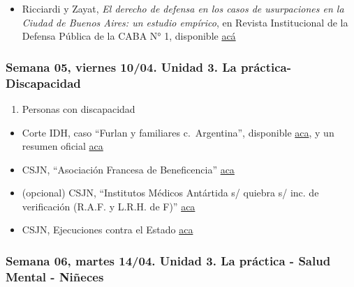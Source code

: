 \documentclass[
]{article}
\providecommand{\tightlist}{%
  \setlength{\itemsep}{0pt}\setlength{\parskip}{0pt}}
\begin{document}
\begin{itemize}
\tightlist
\item
  Ricciardi y Zayat, \emph{El derecho de defensa en los casos de
  usurpaciones en la Ciudad de Buenos Aires: un estudio empírico}, en
  Revista Institucional de la Defensa Pública de la CABA N° 1,
  disponible
  \href{https://drive.google.com/file/d/1KeqFSqkZ2aBrHXkRcIaZCVu6AMSaX7zH/view?usp=sharing}{acá}
\end{itemize}

\subsubsection{Semana 05, viernes 10/04. Unidad 3. La práctica-
Discapacidad}\label{semana-05-viernes-1004.-unidad-3.-la-pruxe1ctica--discapacidad}

\begin{enumerate}
\def\labelenumi{\alph{enumi}.}
\setcounter{enumi}{2}
\tightlist
\item
  Personas con discapacidad
\end{enumerate}

\begin{itemize}
\item
  Corte IDH, caso ``Furlan y familiares c.~Argentina'', disponible
  \href{https://www.corteidh.or.cr/docs/casos/articulos/seriec_246_esp.pdf}{aca},
  y un resumen oficial
  \href{https://www.corteidh.or.cr/docs/casos/articulos/resumen_246_esp.pdf}{aca}
\item
  CSJN, ``Asociación Francesa de Beneficencia''
  \href{https://drive.google.com/file/d/1hVROXu_IFbswD_0UtcBpXPZ0gEbTIiQJ/view?usp=share_link}{aca}
\item
  (opcional) CSJN, ``Institutos Médicos Antártida s/ quiebra s/ inc. de
  verificación (R.A.F. y L.R.H. de F)''
  \href{https://drive.google.com/file/d/1THtTAOVsLhI8y5mQq5mNTLrt-LFdFc-K/view?usp=sharing}{aca}
\item
  CSJN, Ejecuciones contra el Estado
  \href{https://drive.google.com/file/d/1X2oK8aGhqhadJ7YkQCHktaT49Ypk5udZ/view?usp=share_link}{aca}
\end{itemize}

\subsubsection{Semana 06, martes 14/04. Unidad 3. La práctica - Salud
Mental -
Niñeces}\label{semana-06-martes-1404.-unidad-3.-la-pruxe1ctica---salud-mental---niuxf1eces}
\end{document}
